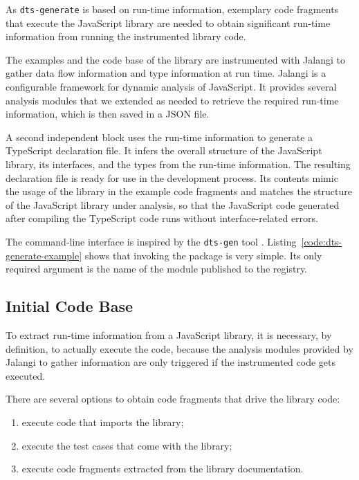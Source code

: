 \documentclass[english,cleveref,autoref,submission]{programming}
\newcommand{\coderef}[1]{Listing~\ref{#1}}
\begin{document}
As \texttt{dts-generate} is based on run-time information, 
exemplary code fragments that execute the JavaScript library are
needed to obtain 
significant run-time information from running the instrumented library
code.


The examples and the code base of the library are instrumented with
Jalangi \cite{DBLP:conf/sigsoft/SenKBG13} to gather data flow
information and type information at run time. Jalangi is a configurable
framework for dynamic analysis of JavaScript. It provides several
analysis modules that we extended as needed to retrieve the required
run-time information, which is then saved in a JSON file. 

A second independent block uses the run-time information to generate a
TypeScript declaration file. It infers the overall structure of the JavaScript
library, its interfaces, and the types from the run-time information. 
The resulting declaration file is ready for use in the development
process. Its contents mimic the usage of the library in the example
code fragments and matches the structure of the
JavaScript library under analysis, so that the JavaScript code
generated after compiling the TypeScript code runs without
interface-related errors.

The command-line interface is inspired by the \texttt{dts-gen} tool
\cite{dts-gen}. \coderef{code:dts-generate-example} shows
that invoking the package is very simple. Its only required
argument is the name of the module published to the \NPM{} registry. 


\subsection{Initial Code Base}
\label{sec:initial-code-base}

To extract run-time information from a JavaScript library, it is
necessary, by definition, to actually execute the code, because the
analysis modules provided by Jalangi to gather information are only
triggered if the instrumented code gets executed.

There are several options to obtain code fragments that drive the
library code:
\begin{enumerate}
\item\label{item:1} execute code that imports the library;
\item\label{item:2} execute the test cases that come with the library;
\item\label{item:3} execute code fragments extracted from the library documentation.
\end{enumerate}
\end{document}
